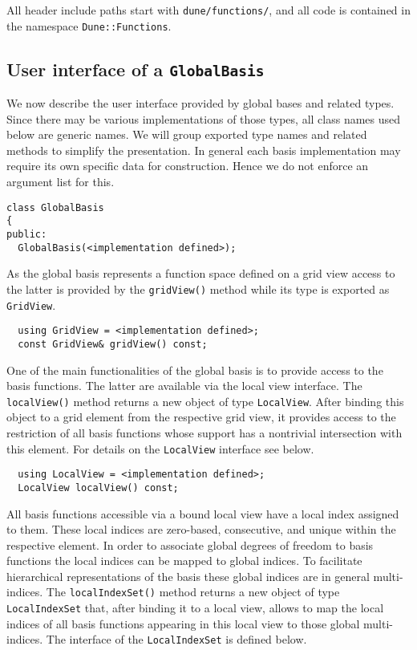 \documentclass[a4paper,10pt,headings=normal,bibliography=totoc]{scrartcl}
\newcommand{\cpp}[1]{\lstinline[basicstyle=\ttfamily]!#1!}
\newcommand{\todosander}[1]{\todo[inline,color=orange,author=OS]{#1}}
\begin{document}
All header include paths
start with \cpp{dune/functions/}, and all code is contained in the namespace \cpp{Dune::Functions}.

\todosander{We are using duck typing and type erasure.}


\subsection{User interface of a \texttt{GlobalBasis}}
We now describe the user interface provided by global bases and related types.
Since there may be various implementations of those types, all class names used
below are generic names.  We will group exported type names and related methods
to simplify the presentation.
In general each basis implementation may require its own specific data for construction.
Hence we do not enforce an argument list for this.

\begin{lstlisting}
class GlobalBasis
{
public:
  GlobalBasis(<implementation defined>);
\end{lstlisting}

As the global basis represents a function space defined on a grid view access to
the latter is provided by the \texttt{gridView()} method while its type
is exported as \texttt{GridView}.

\begin{lstlisting}
  using GridView = <implementation defined>;
  const GridView& gridView() const;
\end{lstlisting}

One of the main functionalities of the global basis is to provide
access to the basis functions. The latter are available via the
local view interface. The \texttt{localView()} method returns a new
object of type \texttt{LocalView}. After binding this object to a
grid element from the respective grid view, it provides access
to the restriction of all basis functions whose support has a
nontrivial intersection with this element. For details on the
\texttt{LocalView} interface see below.

\begin{lstlisting}
  using LocalView = <implementation defined>;
  LocalView localView() const;
\end{lstlisting}

All basis functions accessible via a bound local view have a
local index assigned to them. These local indices are zero-based,
consecutive, and unique within the respective element.
In order to  associate global degrees of freedom to basis functions
the local indices can be mapped to global indices. To facilitate
hierarchical representations of the basis these global indices
are in general multi-indices. The \texttt{localIndexSet()} method
returns a new object of type \texttt{LocalIndexSet} that, after
binding it to a local view, allows to map the local indices
of all basis functions appearing in this local view to those
global multi-indices. The interface of the \texttt{LocalIndexSet}
is defined below.
\end{document}
